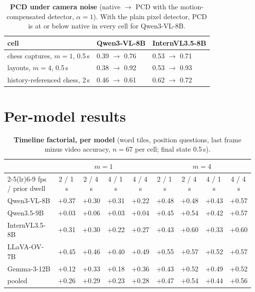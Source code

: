 \begin{table}[h]
  \centering
  \small
  \caption{\textbf{PCD under camera noise} (native $\to$ PCD with the motion-compensated detector, $\alpha=1$). With the plain pixel detector, PCD is at or below native in every cell for Qwen3-VL-8B.}
  \label{tab:noise}
  \begin{tabular}{lll}
    \toprule
    cell & Qwen3-VL-8B & InternVL3.5-8B \\
    \midrule
    chess captures, $m=1$, 0.5\,s & 0.39 $\to$ 0.76 & 0.53 $\to$ 0.71 \\
    layouts, $m=4$, 0.5\,s & 0.38 $\to$ 0.92 & 0.53 $\to$ 0.93 \\
    history-referenced chess, 2\,s & 0.46 $\to$ 0.61 & 0.62 $\to$ 0.72 \\
    \bottomrule
  \end{tabular}
\end{table}

\section{Per-model results}
\label{app:models}

\begin{table}[h]
  \centering
  \small
  \caption{\textbf{Timeline factorial, per model} (word tiles, position questions, last frame minus video accuracy, $n=67$ per cell; final state 0.5\,s).}
  \label{tab:ad-models}
  \begin{tabular}{lcccccccc}
    \toprule
    & \multicolumn{4}{c}{$m=1$} & \multicolumn{4}{c}{$m=4$} \\
    \cmidrule(lr){2-5}\cmidrule(lr){6-9}
    fps / prior dwell & 2 / 1\,s & 2 / 4\,s & 4 / 1\,s & 4 / 4\,s & 2 / 1\,s & 2 / 4\,s & 4 / 1\,s & 4 / 4\,s \\
    \midrule
    Qwen3-VL-8B & +0.37 & +0.30 & +0.31 & +0.22 & +0.48 & +0.48 & +0.43 & +0.57 \\
    Qwen3.5-9B & +0.03 & +0.06 & +0.03 & +0.04 & +0.45 & +0.54 & +0.42 & +0.57 \\
    InternVL3.5-8B & +0.31 & +0.30 & +0.22 & +0.27 & +0.43 & +0.60 & +0.33 & +0.60 \\
    LLaVA-OV-7B & +0.45 & +0.46 & +0.40 & +0.49 & +0.55 & +0.57 & +0.52 & +0.57 \\
    Gemma-3-12B & +0.12 & +0.33 & +0.18 & +0.36 & +0.43 & +0.52 & +0.49 & +0.52 \\
    \midrule
    pooled & +0.26 & +0.29 & +0.23 & +0.28 & +0.47 & +0.54 & +0.44 & +0.56 \\
    \bottomrule
  \end{tabular}
\end{table}

